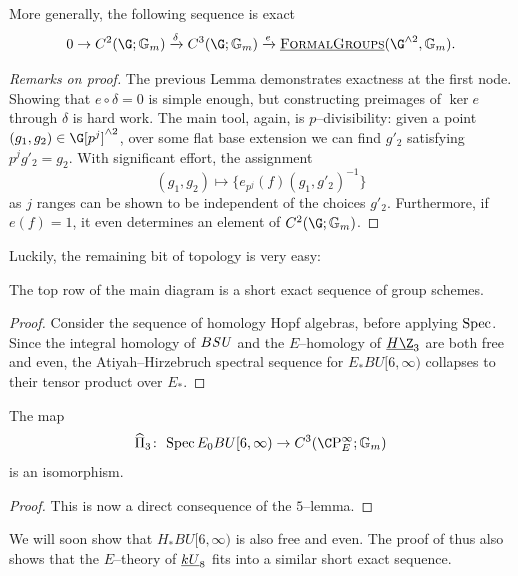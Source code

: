 \begin{lemma}
More generally, the following sequence is exact \[0 \to C^2(\G; \Gm) \xrightarrow\delta C^3(\G; \Gm) \xrightarrow{e} \InternalHom{FormalGroups}(\G^{\sm 2}, \Gm).\]
\end{lemma}
\begin{proof}[Remarks on proof]
The previous Lemma demonstrates exactness at the first node.
Showing that \(e \circ \delta = 0\) is simple enough, but constructing preimages of \(\ker e\) through \(\delta\) is hard work.
The main tool, again, is \(p\)--divisibility: given a point \((g_1, g_2) \in \G[p^j]^{\sm 2}\), over some flat base extension we can find \(g'_2\) satisfying \(p^j g'_2 = g_2\).
With significant effort, the assignment \[(g_1, g_2) \mapsto \{e_{p^j}(f)(g_1, g'_2)^{-1}\}\] as \(j\) ranges can be shown to be independent of the choices \(g'_2\).
Furthermore, if \(e(f) = 1\), it even determines an element of \(C^2(\G; \Gm)\).
\end{proof}

Luckily, the remaining bit of topology is very easy:

\begin{lemma}\label{ASTopologyExactSequence}
The top row of the main diagram is a short exact sequence of group schemes.
\end{lemma}
\begin{proof}
Consider the sequence of homology Hopf algebras, before applying \(\operatorname{Spec}\).
Since the integral homology of \(B\mathit{SU}\) and the \(E\)--homology of \(\OS{H\Z}{3}\) are both free and even, the Atiyah--Hirzebruch spectral sequence for \(E_* BU[6, \infty)\) collapses to their tensor product over \(E_*\).
\end{proof}

\begin{corollary}
The map \[\widehat \Pi_3\co \Spec E_0 BU[6, \infty) \to C^3(\CP^\infty_E; \Gm)\] is an isomorphism.
\end{corollary}
\begin{proof}
This is now a direct consequence of the \(5\)--lemma.
\end{proof} 

\begin{remark}
We will soon show that \(H_* BU[6, \infty)\) is also free and even.
The proof of  thus also shows that the \(E\)--theory of \(\OS{kU}{8}\) fits into a similar short exact sequence.
\end{remark}

